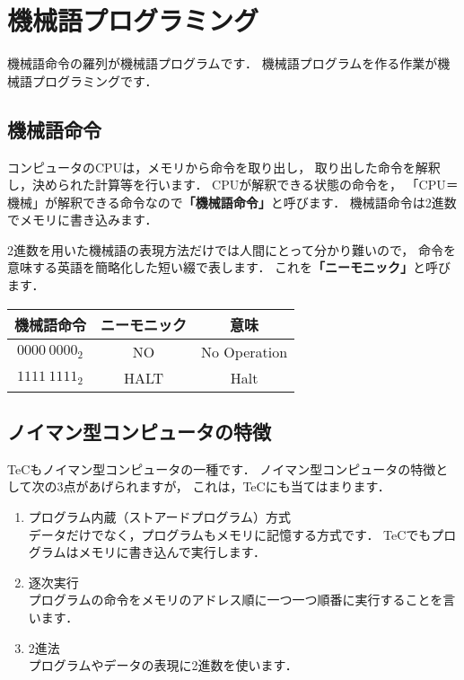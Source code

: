\newpage
\section{機械語プログラミング}
機械語命令の羅列が機械語プログラムです．
機械語プログラムを作る作業が機械語プログラミングです．

\subsection{機械語命令}
コンピュータのCPUは，メモリから命令を取り出し，
取り出した命令を解釈し，決められた計算等を行います．
CPUが解釈できる状態の命令を，
「CPU＝機械」が解釈できる命令なので{\bf 「機械語命令」}と呼びます．
機械語命令は2進数でメモリに書き込みます．

2進数を用いた機械語の表現方法だけでは人間にとって分かり難いので，
命令を意味する英語を簡略化した短い綴で表します．
これを{\bf 「ニーモニック」}と呼びます．

{\tt\small\begin{center}
\begin{tabular}{|c|c|c|} \hline
機械語命令 & ニーモニック & 意味\\
\hline
$0000~0000_{2}$ & NO & No Operation \\
$1111~1111_{2}$ & HALT & Halt \\
\hline
\end{tabular}
\end{center}}

\subsection{ノイマン型コンピュータの特徴}
TeCもノイマン型コンピュータの一種です．
ノイマン型コンピュータの特徴として次の3点があげられますが，
これは，TeCにも当てはまります．
\begin{enumerate}
\item プログラム内蔵（ストアードプログラム）方式 \\
データだけでなく，プログラムもメモリに記憶する方式です．
TeCでもプログラムはメモリに書き込んで実行します．
\item 逐次実行 \\
プログラムの命令をメモリのアドレス順に一つ一つ順番に実行することを言います．
\item 2進法 \\
プログラムやデータの表現に2進数を使います．
\end{enumerate}


